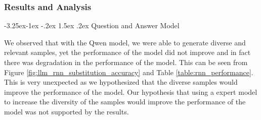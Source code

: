 \documentclass{article}
\makeatletter
\renewcommand\paragraph{\@startsection{paragraph}{4}{\z@}%
                                     {-3.25ex\@plus -1ex \@minus -.2ex}%
                                     {1.5ex \@plus .2ex}%
                                     {\normalfont\normalsize\bfseries}}
\makeatother
\begin{document}
\subsubsection{Results and Analysis}

\paragraph{Question and Answer Model}

We observed that with the Qwen model, we were able to generate diverse and
relevant samples, yet the performance of the model did not improve and in fact
there was degradation in the performance of the model. This can be seen from
Figure \ref{fig:llm_rnn_substitution_accuracy} and Table
\ref{table:rnn_performance}. This is very unexpected as we hypothesized that
the diverse samples would improve the performance of the model. Our hypothesis
that using a expert model to increase the diversity of the samples would
improve the performance of the model was not supported by the results.
\end{document}
